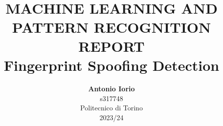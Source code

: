 \title{ \normalsize \textsc{}
\\ [2.0cm]
\HRule{1.5pt} \\
\LARGE \textbf{\uppercase{Machine Learning and Pattern Recognition Report}
\HRule{2.0pt} \\ [0.6cm] \LARGE{Fingerprint Spoofing Detection} \vspace*{10\baselineskip}}
}
\date{}
\author{\textbf{Antonio Iorio} \\
s317748 \\
Politecnico di Torino \\
2023/24}

\maketitle
\newpage

\tableofcontents
\newpage